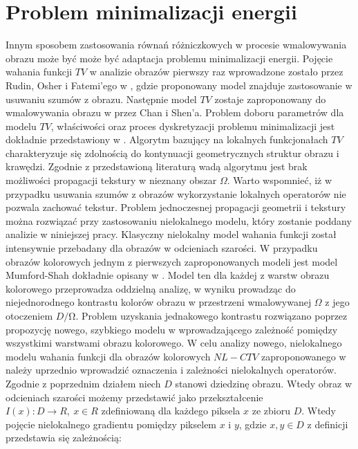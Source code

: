 \documentclass[12pt, twoside, openany]{report}
\theoremstyle{definition}
\begin{document}
\section{Problem minimalizacji energii}
	Innym sposobem zastosowania równań różniczkowych w procesie wmalowywania obrazu może być może być adaptacja problemu minimalizacji energii. Pojęcie wahania funkcji $TV$ w analizie obrazów pierwszy raz wprowadzone zostało przez Rudin, Osher i Fatemi’ego w \cite{rudin1992nonlinear}, gdzie proponowany model znajduje zastosowanie w usuwaniu szumów z obrazu. Następnie model $TV$ zostaje zaproponowany do wmalowywania obrazu w \cite{MathematicalModelsforNLTextureInpainting} przez Chan i Shen’a. Problem doboru parametrów dla modelu $TV$, właściwości oraz proces dyskretyzacji problemu minimalizacji jest dokładnie przedstawiony w \cite{getreuer2012total}. Algorytm bazujący na lokalnych funkcjonałach $TV$  charakteryzuje się zdolnością do kontynuacji geometrycznych struktur obrazu i krawędzi. Zgodnie z przedstawioną literaturą wadą algorytmu jest brak możliwości propagacji tekstury w nieznany obszar $\Omega$. Warto wspomnieć, iż w przypadku usuwania szumów z obrazów wykorzystanie lokalnych operatorów nie pozwala zachować tekstur. Problem jednoczesnej propagacji geometrii i tekstury można rozwiązać przy zastosowaniu nielokalnego modelu, który zostanie poddany analizie w niniejszej pracy.
	Klasyczny nielokalny model wahania funkcji został intensywnie przebadany dla obrazów w odcieniach szarości. W przypadku obrazów kolorowych jednym z pierwszych zaproponowanych modeli jest model Mumford-Shah dokładnie opisany w \cite{jung2011nonlocal}. Model ten dla każdej z warstw obrazu kolorowego przeprowadza oddzielną analizę, w wyniku prowadząc do niejednorodnego kontrastu kolorów obrazu w przestrzeni wmalowywanej $\Omega$ z jego otoczeniem $D/\mathrm{\Omega}$. Problem uzyskania jednakowego kontrastu rozwiązano poprzez propozycję nowego, szybkiego modelu w \cite{duan2015fast} wprowadzającego zależność pomiędzy wszystkimi warstwami obrazu kolorowego. W celu analizy nowego, nielokalnego modelu wahania funkcji dla obrazów kolorowych $NL-CTV$ zaproponowanego w \cite{duan2015fast} należy uprzednio wprowadzić oznaczenia i zależności nielokalnych operatorów. 
	Zgodnie z poprzednim działem niech $D$ stanowi dziedzinę obrazu. Wtedy obraz w odcieniach szarości możemy przedstawić jako przekształcenie $I\left(x\right):D\longrightarrow R,\ x\in R$ zdefiniowaną dla każdego piksela $x$ ze zbioru $D$. Wtedy pojęcie nielokalnego gradientu pomiędzy pikselem $x$ i $y$, gdzie $x,y\in D$ z definicji przedstawia się zależnością:
\end{document}
